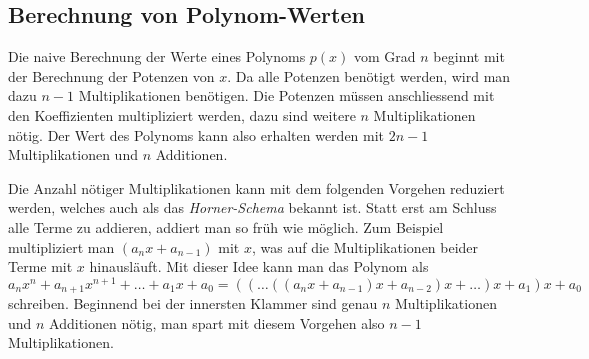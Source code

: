 %
%
\subsection{Berechnung von Polynom-Werten}
Die naive Berechnung der Werte eines Polynoms $p(x)$ vom Grad $n$
beginnt mit der Berechnung der Potenzen von $x$.
Da alle Potenzen benötigt werden, wird man dazu $n-1$ Multiplikationen
benötigen.
Die Potenzen müssen anschliessend mit den Koeffizienten multipliziert
werden, dazu sind weitere $n$ Multiplikationen nötig.
Der Wert des Polynoms kann also erhalten werden mit $2n-1$ Multiplikationen
und $n$ Additionen.

Die Anzahl nötiger Multiplikationen kann mit dem folgenden Vorgehen
reduziert werden, welches auch als das {\em Horner-Schema} bekannt ist.
%
%
Statt erst am Schluss alle Terme zu addieren, addiert man so früh
wie möglich.
Zum Beispiel multipliziert man $(a_nx+a_{n-1})$ mit $x$, was auf
die Multiplikationen beider Terme mit $x$ hinausläuft.
Mit dieser Idee kann man das Polynom als
\[
a_nx^n
+
a_{n+1}x^{n+1}
+
\dots
+
a_1x
+
a_0
=
((\dots((a_nx+a_{n-1})x+a_{n-2})x+\dots )x+a_1)x+a_0
\]
schreiben.
Beginnend bei der innersten Klammer sind genau $n$ Multiplikationen
und $n$ Additionen nötig, man spart mit diesem Vorgehen also
$n-1$ Multiplikationen. 




